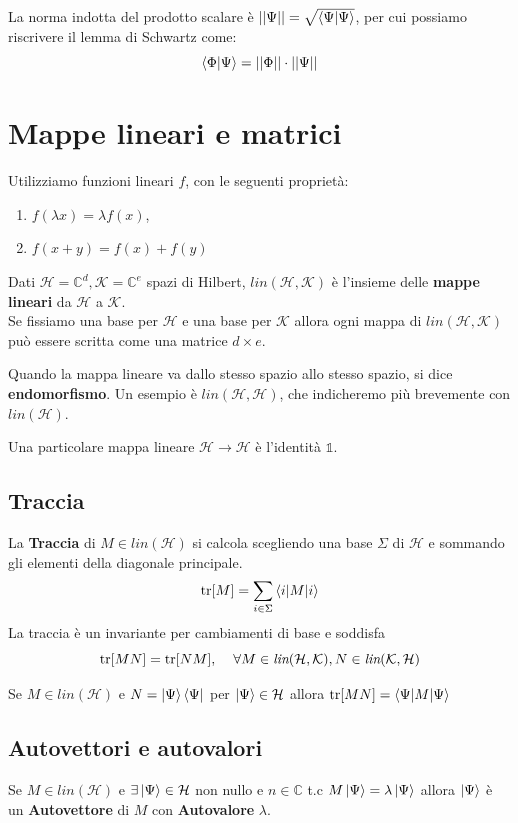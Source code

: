 La norma indotta del prodotto scalare è $\left| \left| \Psi\right| \right| = \sqrt{\braket{\Psi|\Psi}}$, per cui possiamo riscrivere il lemma di Schwartz come:
$$\braket{\Phi|\Psi} = \left| \left|\Phi \right| \right| \cdot \left| \left|\Psi \right| \right|$$

\section{Mappe lineari e matrici}
Utilizziamo funzioni lineari $f$, con le seguenti proprietà:
\begin{enumerate}
	\item $f(\lambda x) = \lambda f(x)$,
	\item $f(x+y) = f(x) + f(y)$ 
\end{enumerate}

Dati $\mathcal{H}= \mathbb{C}^d, \mathcal{K} = \mathbb{C}^e$ spazi di Hilbert, $\textit{lin}(\mathcal{H},\mathcal{K})$ è l'insieme delle \textbf{mappe lineari} da $\mathcal{H}$ a $\mathcal{K}$.\\ Se fissiamo una base per $\mathcal{H}$ e una base per $\mathcal{K}$ allora ogni mappa di $\textit{lin}(\mathcal{H},\mathcal{K})$ può essere scritta come una matrice $d\times e$.

Quando la mappa lineare va dallo stesso spazio allo stesso spazio, si dice \textbf{endomorfismo}. Un esempio è $\textit{lin}(\mathcal{H},\mathcal{H}) $, che indicheremo più brevemente con $\textit{lin}(\mathcal{H})$. 


Una particolare mappa lineare $\mathcal{H} \to \mathcal{H}$ è l'identità $ \mathbb{1}$.

\subsection{Traccia}
La \textbf{Traccia} di $M \in \textit{lin}(\mathcal{H})$ si calcola scegliendo una base $\Sigma$ di $\mathcal{H}$ e sommando gli elementi della diagonale principale.
$$\text{tr}[M] = \sum_{i \in \Sigma} \braket{i|M|i}$$
La traccia  è un invariante  per cambiamenti di base e soddisfa 
$$\text{tr}[MN] = \text{tr}[NM],\hspace{0.4cm} \forall M\in \textit{lin}(\mathcal{H,K}),N\in \textit{lin}(\mathcal{K,H})$$

Se $M\in \textit{lin}(\mathcal{H})$ e $N = \ket{\Psi}\bra{\Psi}$ per $\ket{\Psi}\in \mathcal{H}$ allora 
$\text{tr}[MN]=\braket{\Psi|M|\Psi}$

\subsection{Autovettori e autovalori}
Se $M\in \textit{lin}(\mathcal{H})$ e $\exists\ket{\Psi}\in \mathcal{H}$ non nullo e $n \in \mathbb{C}$ t.c $M \ket{\Psi} = \lambda \ket{\Psi}$ allora $\ket{\Psi}$ è un \textbf{Autovettore} di $M$ con \textbf{Autovalore} $\lambda$.

